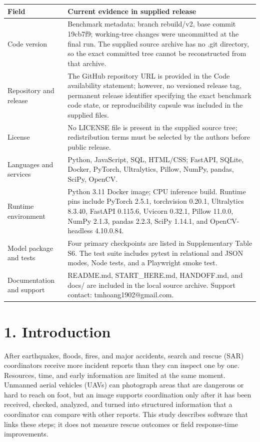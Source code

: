 \documentclass[pdflatex,sn-mathphys-ay]{sn-jnl}
\begin{document}
\begin{center}
\small
\renewcommand{\arraystretch}{1.15}
\setlength{\tabcolsep}{3pt}
\begin{tabularx}{\textwidth}{|X|X|}\hline
Field & Current evidence in supplied release \\ \hline
Code version & Benchmark metadata: branch rebuild/v2, base commit 19cb7f9; working-tree changes were uncommitted at the final run. The supplied source archive has no .git directory, so the exact committed tree cannot be reconstructed from that archive. \\ \hline
Repository and release & The GitHub repository URL is provided in the Code availability statement; however, no versioned release tag, permanent release identifier specifying the exact benchmark code state, or reproducibility capsule was included in the supplied files. \\ \hline
License & No LICENSE file is present in the supplied source tree; redistribution terms must be selected by the authors before public release. \\ \hline
Languages and services & Python, JavaScript, SQL, HTML/CSS; FastAPI, SQLite, Docker, PyTorch, Ultralytics, Pillow, NumPy, pandas, SciPy, OpenCV. \\ \hline
Runtime environment & Python 3.11 Docker image; CPU inference build. Runtime pins include PyTorch 2.5.1, torchvision 0.20.1, Ultralytics 8.3.40, FastAPI 0.115.6, Uvicorn 0.32.1, Pillow 11.0.0, NumPy 2.1.3, pandas 2.2.3, SciPy 1.14.1, and OpenCV-headless 4.10.0.84. \\ \hline
Model package and tests & Four primary checkpoints are listed in Supplementary Table S6. The test suite includes pytest in relational and JSON modes, Node tests, and a Playwright smoke test. \\ \hline
Documentation and support & README.md, START\_HERE.md, HANDOFF.md, and docs/ are included in the local source archive. Support contact: tmhoang1902@gmail.com. \\ \hline
\end{tabularx}
\end{center}

\section*{1. Introduction}

After earthquakes, floods, fires, and major accidents, search and rescue (SAR) coordinators receive more incident reports than they can inspect one by one. Resources, time, and early information are limited at the same moment. Unmanned aerial vehicles (UAVs) can photograph areas that are dangerous or hard to reach on foot, but an image supports coordination only after it has been received, checked, analyzed, and turned into structured information that a coordinator can compare with other reports. This study describes software that links these steps; it does not measure rescue outcomes or field response-time improvements.
\end{document}
